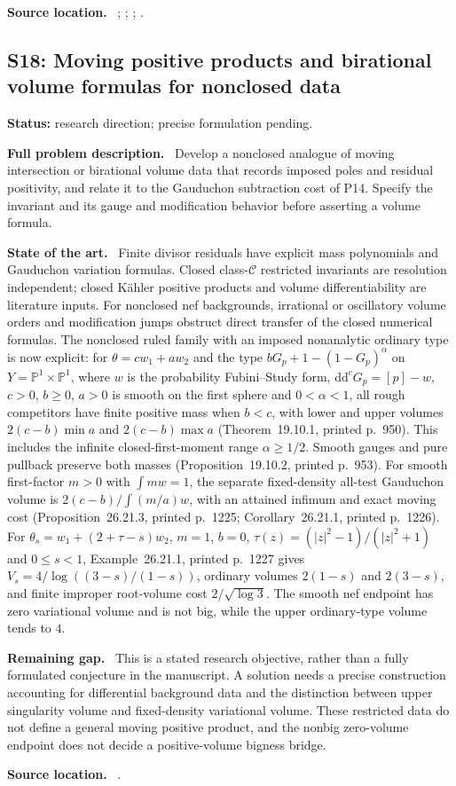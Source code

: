 \documentclass[11pt]{article}
\newcommand{\ddc}{\mathrm d\mathrm d^c}
\newcommand{\field}[1]{\par\medskip\noindent\textbf{#1.}\ }
\begin{document}
\field{Source location} ; ; ; .
\subsection{S18: Moving positive products and birational volume formulas for nonclosed data}
\label{S18}
\noindent\textbf{Status:} research direction; precise formulation pending.
\field{Full problem description} Develop a nonclosed analogue of moving intersection or birational volume data that records imposed poles and residual positivity, and relate it to the Gauduchon subtraction cost of P14. Specify the invariant and its gauge and modification behavior before asserting a volume formula.
\field{State of the art} Finite divisor residuals have explicit mass polynomials and Gauduchon variation formulas. Closed class-$\mathcal C$ restricted invariants are resolution independent; closed K\"ahler positive products and volume differentiability are literature inputs. For nonclosed nef backgrounds, irrational or oscillatory volume orders and modification jumps obstruct direct transfer of the closed numerical formulas. The nonclosed ruled family with an imposed nonanalytic ordinary type is now explicit: for $\theta=cw_1+aw_2$ and the type $bG_p+1-(1-G_p)^\alpha$ on $Y=\mathbb P^1\times\mathbb P^1$, where $w$ is the probability Fubini--Study form, $\ddc G_p=[p]-w$, $c>0$, $b\geq0$, $a>0$ is smooth on the first sphere and $0<\alpha<1$, all rough competitors have finite positive mass when $b<c$, with lower and upper volumes $2(c-b)\min a$ and $2(c-b)\max a$ (Theorem~19.10.1, printed p.~950). This includes the infinite closed-first-moment range $\alpha\geq1/2$. Smooth gauges and pure pullback preserve both masses (Proposition~19.10.2, printed p.~953). For smooth first-factor $m>0$ with $\int mw=1$, the separate fixed-density all-test Gauduchon volume is $2(c-b)/\int(m/a)w$, with an attained infimum and exact moving cost (Proposition~26.21.3, printed p.~1225; Corollary~26.21.1, printed p.~1226). For $\theta_s=w_1+(2+\tau-s)w_2$, $m=1$, $b=0$, $\tau(z)=(|z|^2-1)/(|z|^2+1)$ and $0\leq s<1$, Example~26.21.1, printed p.~1227 gives $V_s=4/\log((3-s)/(1-s))$, ordinary volumes $2(1-s)$ and $2(3-s)$, and finite improper root-volume cost $2/\sqrt{\log3}$. The smooth nef endpoint has zero variational volume and is not big, while the upper ordinary-type volume tends to $4$.
\field{Remaining gap} This is a stated research objective, rather than a fully formulated conjecture in the manuscript. A solution needs a precise construction accounting for differential background data and the distinction between upper singularity volume and fixed-density variational volume. These restricted data do not define a general moving positive product, and the nonbig zero-volume endpoint does not decide a positive-volume bigness bridge.
\field{Source location} .
\end{document}
